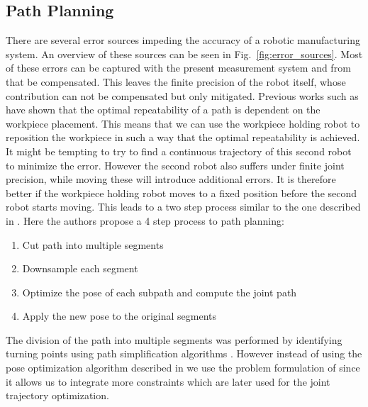 \documentclass[5p,times,procedia]{elsarticle}
\begin{document}
\subsection{Path Planning}\label{subsec:PathPlanning}
There are several error sources impeding the accuracy of a robotic manufacturing system.
An overview of these sources can be seen in Fig.~\ref{fig:error_sources}.
Most of these errors can be captured with the present measurement system and from that be compensated.
%
This leaves the finite precision of the robot itself, whose contribution can not be compensated but only mitigated.
Previous works such as \cite{previous_work} have shown that the optimal repeatability of a path is dependent on the workpiece placement.
This means that we can use the workpiece holding robot to reposition the workpiece in such a way that the optimal repeatability is achieved.
It might be tempting to try to find a continuous trajectory of this second robot to minimize the error.
However the second robot also suffers under finite joint precision, while moving these will introduce additional errors.
It is therefore better if the workpiece holding robot moves to a fixed position before the second robot starts moving.
This leads to a two step process similar to the one described in \cite{stroke_division}.
Here the authors propose a 4 step process to path planning:
\begin{enumerate}
	\item Cut path into multiple segments
	\item Downsample each segment
	\item Optimize the pose of each subpath and compute the joint path
	\item Apply the new pose to the original segments
\end{enumerate}
The division of the path into multiple segments was performed by identifying turning points using path simplification algorithms \cite{stroke_division}.
However instead of using the pose optimization algorithm described in \cite{stroke_division} we use the problem formulation of \cite{previous_work} since it allows us to integrate more constraints which are later used for the joint trajectory optimization.
%
%
%
\end{document}
